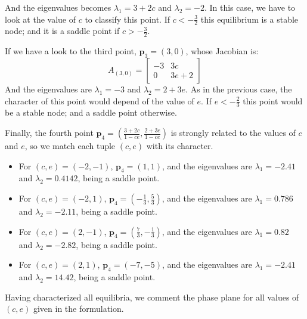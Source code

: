 And the eigenvalues becomes $\lambda_1 = 3 + 2c$ and $\lambda_2 = -2$. In this case, we have to look at the value of $c$ to classify this point. If $c<-\frac{3}{2}$ this equilibrium is a stable node; and it is a saddle point if $c > -\frac{3}{2}$.

If we have a look to the third point, $\mathbf{p}_3 = (3,0)$, whose Jacobian is:
$$
 A_{(3,0)}=
    \left[\begin{array}{cc}
    -3  & 3c\\
    0 & 3e+2
    \end{array}\right]
$$
And the eigenvalues are $\lambda_1 = -3$ and $\lambda_2 = 2+3e$. As in the previous case, the character of this point would depend of the value of $e$. If $e<-\frac{2}{3}$ this point would be a stable node; and a saddle point otherwise. 

Finally, the fourth point $\mathbf{p}_4 = \left( \frac{3+2c}{1-ce}, \frac{2+3e}{1-ce} \right)$ is strongly related to the values of $c$ and $e$, so we match each tuple $(c,e)$ with its character.

\begin{itemize}
\item For $(c,e) = (-2, -1)$, $\mathbf{p}_4 = (1,1)$, and the eigenvalues are $\lambda_1 = -2.41$ and $\lambda_2 = 0.4142$, being a saddle point.
\item For $(c,e) = (-2, 1)$, $\mathbf{p}_4 = (-\frac{1}{3},\frac{5}{3})$, and the eigenvalues are $\lambda_1 = 0.786$ and $\lambda_2 = -2.11$, being a saddle point.
\item For $(c,e) = (2, -1)$, $\mathbf{p}_4 = (\frac{7}{3},-\frac{1}{3})$, and the eigenvalues are $\lambda_1 = 0.82$ and $\lambda_2 = -2.82$, being a saddle point.
\item For $(c,e) = (2, 1)$, $\mathbf{p}_4 = (-7,-5)$, and the eigenvalues are $\lambda_1 = -2.41$ and $\lambda_2 = 14.42$, being a saddle point.
\end{itemize}

Having characterized all equilibria, we comment the phase plane for all values of $(c,e)$ given in the formulation.

